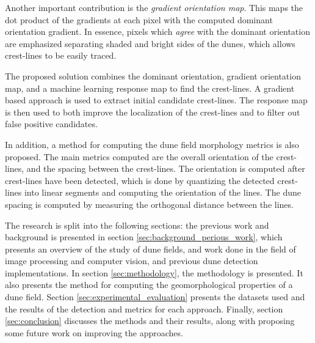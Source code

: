 Another important contribution is the \emph{gradient orientation map}. This maps the dot product of the gradients at each pixel with the computed dominant orientation gradient. In essence, pixels which \emph{agree} with the dominant orientation are emphasized separating shaded and bright sides of the dunes, which allows crest-lines to be easily traced.

The proposed solution combines the dominant orientation, gradient orientation map, and a machine learning response map to find the crest-lines. A gradient based approach is used to extract initial candidate crest-lines. The response map is then used to both improve the localization of the crest-lines and to filter out false positive candidates.

In addition, a method for computing the dune field morphology metrics is also proposed. The main metrics computed are the overall orientation of the crest-lines, and the spacing between the crest-lines. The orientation is computed after crest-lines have been detected, which is done by quantizing the detected crest-lines into linear segments and computing the orientation of the lines. The dune spacing is computed by measuring the orthogonal distance between the lines.

The research is split into the following sections: the previous work and background is presented in section \ref{sec:background_perious_work}, which presents an overview of the study of dune fields, and work done in the field of image processing and computer vision, and previous dune detection implementations. In section \ref{sec:methodology}, the methodology is presented. It also presents the method for computing the geomorphological properties of a dune field. Section \ref{sec:experimental_evaluation} presents the  datasets used and the results of the detection and metrics for each approach. Finally, section \ref{sec:conclusion} discusses the methods and their results, along with proposing some future work on improving the approaches. 